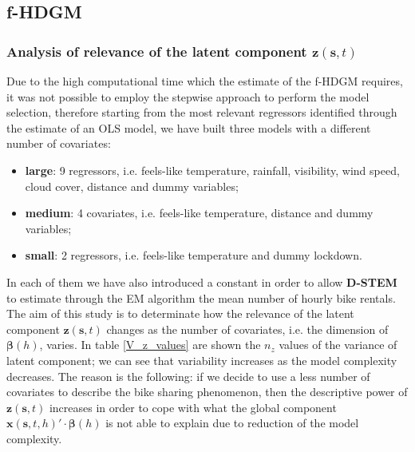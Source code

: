 \subsection{f-HDGM}

\subsubsection{Analysis of relevance of the latent component $\boldsymbol{z}(\boldsymbol{s}, t)$}
 Due to the high computational time which the estimate of the f-HDGM requires, it was not possible to employ the stepwise approach to perform the model selection, therefore starting from the most relevant regressors identified through the estimate of an OLS model, we have built three models with a different number of covariates:
\begin{itemize}
	\item \textbf{large}: \num{9} regressors, i.e. feels-like temperature, rainfall, visibility, wind speed, cloud cover, distance and dummy variables; 
	\item \textbf{medium}: \num{4} covariates, i.e. feels-like temperature, distance and dummy variables;
	\item \textbf{small}: \num{2} regressors, i.e. feels-like temperature and dummy lockdown.
\end{itemize}
 In each of them we have also introduced a constant in order to allow \textbf{D-STEM} to estimate through the EM algorithm the mean number of hourly bike rentals. The aim of this study is to determinate how the relevance of the latent component $\boldsymbol{z}(\boldsymbol{s}, t)$ changes as the number of covariates, i.e. the dimension of $\boldsymbol{\beta}(h)$, varies. In table \ref{V_z_values} are shown the $n_z$ values of the variance of latent component; we can see that variability increases as the model complexity decreases. The reason is the following: if we decide to use a less number of covariates to describe the bike sharing phenomenon, then the descriptive power of $\boldsymbol{z}(\boldsymbol{s}, t)$ increases in order to cope with what the global component $\boldsymbol{x}(\boldsymbol{s}, t, h)' \cdot \boldsymbol{\beta}(h)$ is not able to explain due to reduction of the model complexity.
 
